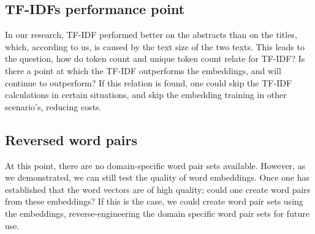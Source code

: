 \documentclass[runningheads]{llncs}
\begin{document}
\subsection{TF-IDFs performance point}
In our research, TF-IDF performed better on the abstracts than on the titles, which, according to us, is caused by the text size of the two texts. This leads to the question, how do token count and unique token count relate for TF-IDF? Is there a point at which the TF-IDF outperforms the embeddings, and will continue to outperform? If this relation is found, one could skip the TF-IDF calculations in certain situations, and skip the embedding training in other scenario's, reducing costs.
\subsection{Reversed word pairs}
At this point, there are no domain-specific word pair sets available. However, as we demonstrated, we can still test the quality of word embeddings. Once one has established that the word vectors are of high quality; could one create word pairs from these embeddings? If this is the case, we could create word pair sets using the embeddings, reverse-engineering the domain specific word pair sets for future use.
%
%


\end{document}
